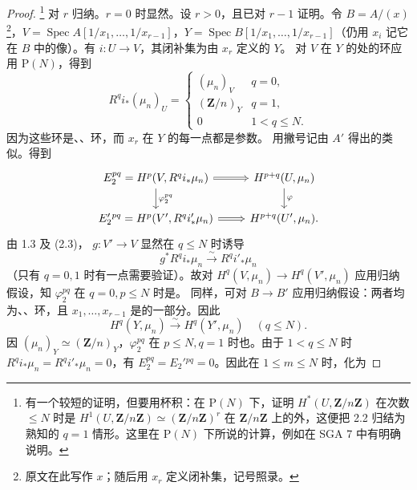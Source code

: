 \begin{proof}
\footnote{有一个较短的证明，但要用杯积：在 $\mathrm P(N)$ 下，证明 $H^*(U,\mathbf Z/n\mathbf Z)$ 在次数 $\le N$ 时是 $H^1(U,\mathbf Z/n\mathbf Z)\simeq(\mathbf Z/n\mathbf Z)^r$ 在 $\mathbf Z/n\mathbf Z$ 上的外，这便把 2.2 归结为熟知的 $q=1$ 情形。这里在 $\mathrm P(N)$ 下所说的计算，例如在 SGA 7 中有明确说明。}
对 $r$ 归纳。$r=0$ 时显然。设 $r>0$，且已对 $r-1$ 证明。令 $B=A/(x)$\footnote{原文在此写作 $x$；随后用 $x_r$ 定义闭补集，记号照录。}，$V=\operatorname{Spec}A[1/x_1,\ldots,1/x_{r-1}]$，$Y=\operatorname{Spec}B[1/x_1,\ldots,1/x_{r-1}]$（仍用 $x_i$ 记它在 $B$ 中的像）。有 $i:U\to V$，其闭补集为由 $x_r$ 定义的 $Y$。
对 $V$ 在 $Y$ 的处的环应用 $\mathrm P(N)$，得到
\[R^qi_*(\mu_n)_U=\begin{cases}(\mu_n)_V&q=0,\\(\mathbf Z/n)_Y&q=1,\\0&1<q\le N.\end{cases}\tag{2.3}\]
因为这些环是、、环，而 $x_r$ 在 $Y$ 的每一点都是参数。
用撇号记由 $A'$ 得出的类似。得到
\[\begin{tikzcd}E_2^{pq}=H^p(V,R^qi_*\mu_n)\arrow[r,Rightarrow]\arrow[d,"\varphi_2^{pq}"]&H^{p+q}(U,\mu_n)\arrow[d,"\varphi"]\\E_2'{}^{pq}=H^p(V',R^qi'_*\mu_n)\arrow[r,Rightarrow]&H^{p+q}(U',\mu_n).\end{tikzcd}\]
由 1.3 及 (2.3)， $g:V'\to V$ 显然在 $q\le N$ 时诱导
\[g^*R^qi_*\mu_n\xrightarrow{\sim}R^qi'_*\mu_n\]
（只有 $q=0,1$ 时有一点需要验证）。故对 $H^q(V,\mu_n)\to H^q(V',\mu_n)$ 应用归纳假设，知 $\varphi_2^{pq}$ 在 $q=0,p\le N$ 时是。
同样，可对 $B\to B'$ 应用归纳假设：两者均为、、环，且 $x_1,\ldots,x_{r-1}$ 是的一部分。因此
\[H^q(Y,\mu_n)\xrightarrow{\sim}H^q(Y',\mu_n)\quad(q\le N).\]
因 $(\mu_n)_Y\simeq(\mathbf Z/n)_Y$，$\varphi_2^{pq}$ 在 $p\le N,q=1$ 时也。由于 $1<q\le N$ 时 $R^qi_*\mu_n=R^qi'_*\mu_n=0$，有 $E_2^{pq}=E_2'{}^{pq}=0$。因此在 $1\le m\le N$ 时，化为

\end{proof}
